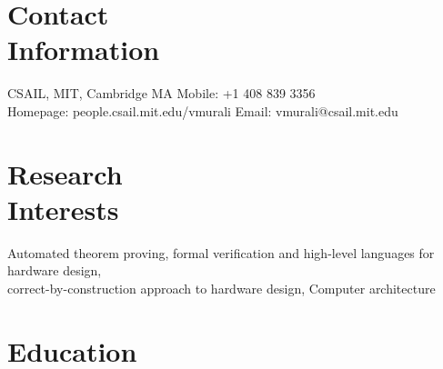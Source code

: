 \documentclass[margin,line]{resume}
\begin{document}
\begin{resume}

    \section{\mysidestyle Contact\\Information}

    CSAIL, MIT, Cambridge MA   \hfill Mobile: +1 408 839 3356          \\
    Homepage: people.csail.mit.edu/vmurali     \hfill Email: vmurali@csail.mit.edu    \\

    \vspace{-7mm}
    \section{\mysidestyle Research\\Interests}

    Automated theorem proving, formal verification and high-level languages for hardware design,\\
    correct-by-construction approach to hardware design, Computer architecture

    \vspace{-3mm}
    \section{\mysidestyle Education}


\end{resume}
\end{document}
